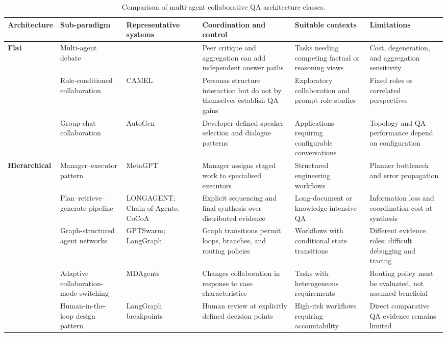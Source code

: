 \begin{table}[pos=t]
  \centering
  \caption{Comparison of multi-agent collaborative QA architecture classes.}
  \label{tab:9categories}
  \scriptsize
  \begin{tabular}{p{1.4cm} p{2.0cm} p{2.4cm}  p{3.2cm} p{2.3cm} p{2.2cm}}
    \toprule
    \textbf{Architecture} & \textbf{Sub-paradigm} &
    \textbf{Representative systems} &
    \textbf{Coordination and control} &
    \textbf{Suitable contexts} & \textbf{Limitations} \\
    \midrule
    \multirow{3}{*}{\textbf{Flat}} &
    Multi-agent debate & \citet{du2024multiagent_debate} & 
    Peer critique and aggregation can add independent answer paths &
    Tasks needing competing factual or reasoning views &
    Cost, degeneration, and aggregation sensitivity \\
    & Role-conditioned collaboration & CAMEL \citep{li2023camel} & 
    Personas structure interaction but do not by themselves establish QA gains &
    Exploratory collaboration and prompt-role studies &
    Fixed roles or correlated perspectives \\
    & Group-chat collaboration & AutoGen \citep{wu2024autogen}  &
    Developer-defined speaker selection and dialogue patterns &
    Applications requiring configurable conversations &
    Topology and QA performance depend on configuration \\
    \midrule
    \multirow{3}{*}{\textbf{Hierarchical}} &
    Manager--executor pattern & MetaGPT \citep{hong2024metagpt}  &
    Manager assigns staged work to specialised executors &
    Structured engineering workflows &
    Planner bottleneck and error propagation \\
    & Plan--retrieve--generate pipeline & LONGAGENT; Chain-of-Agents; CoCoA
    \citep{zhao2024longagent,zhang2024chain_agents,jiang2026cocoa}  &
    Explicit sequencing and final synthesis over distributed evidence &
    Long-document or knowledge-intensive QA &
    Information loss and coordination cost at synthesis \\
   
    \midrule
    \multirow{3}{*}{\textbf{Hybrid}} &
    Graph-structured agent networks & GPTSwarm; LangGraph
    \citep{zhuge2024gptswarm,langgraph2024}  &
    Graph transitions permit loops, branches, and routing policies &
    Workflows with conditional state transitions &
    Different evidence roles; difficult debugging and tracing \\
    & Adaptive collaboration-mode switching & MDAgents \citep{kim2024mdagents}  &
    Changes collaboration in response to case characteristics &
    Tasks with heterogeneous requirements &
    Routing policy must be evaluated, not assumed beneficial \\
    & Human-in-the-loop design pattern & LangGraph breakpoints \citep{langgraph2024} &
    Human review at explicitly defined decision points &
    High-risk workflows requiring accountability &
    Direct comparative QA evidence remains limited \\
    \bottomrule
  \end{tabular}
\end{table}